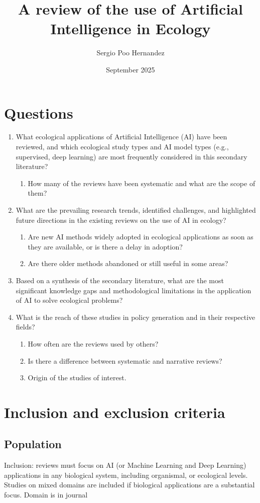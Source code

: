 \documentclass{article}
\title{A review of the use of Artificial Intelligence in Ecology}
\author{Sergio Poo Hernandez}
\date{September 2025}
\newcommand{\ben}{\begin{enumerate}}
\newcommand{\een}{\end{enumerate}}
\begin{document}
\maketitle

\section{Questions}
\ben
\item What ecological applications of Artificial Intelligence (AI) have been reviewed, and which ecological study types and AI model types (e.g., supervised, deep learning) are most frequently considered in this secondary literature?
\ben
\item How many of the reviews have been systematic and what are the scope of them?
\een
\item What are the prevailing research trends, identified challenges, and highlighted future directions in the existing reviews on the use of AI in ecology? 
\ben
\item Are new AI methods widely adopted in ecological applications as soon as they are available, or is there a delay in adoption?
\item Are there older methods abandoned or still useful in some areas?
\een
\item Based on a synthesis of the secondary literature, what are the most significant knowledge gaps and methodological limitations in the application of AI to solve ecological problems?
\item What is the reach of these studies in policy generation and in their respective fields?
\ben
\item How often are the reviews used by others?
\item Is there a difference between systematic and narrative reviews?
\item Origin of the studies of interest.
\een
\een

\section{Inclusion and exclusion criteria}
\subsection{Population}
Inclusion: reviews must focus on AI (or Machine Learning and Deep Learning) applications in any biological system, including organismal, or ecological levels. Studies on mixed domains are included if biological applications are a substantial focus. Domain is in journal
\end{document}
